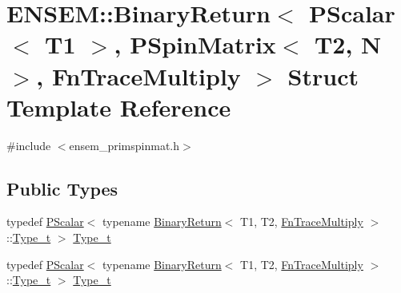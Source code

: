 \hypertarget{structENSEM_1_1BinaryReturn_3_01PScalar_3_01T1_01_4_00_01PSpinMatrix_3_01T2_00_01N_01_4_00_01FnTraceMultiply_01_4}{}\section{E\+N\+S\+EM\+:\+:Binary\+Return$<$ P\+Scalar$<$ T1 $>$, P\+Spin\+Matrix$<$ T2, N $>$, Fn\+Trace\+Multiply $>$ Struct Template Reference}
\label{structENSEM_1_1BinaryReturn_3_01PScalar_3_01T1_01_4_00_01PSpinMatrix_3_01T2_00_01N_01_4_00_01FnTraceMultiply_01_4}


{\ttfamily \#include $<$ensem\+\_\+primspinmat.\+h$>$}

\subsection*{Public Types}
\begin{DoxyCompactItemize}
\item 
typedef \mbox{\hyperlink{classENSEM_1_1PScalar}{P\+Scalar}}$<$ typename \mbox{\hyperlink{structENSEM_1_1BinaryReturn}{Binary\+Return}}$<$ T1, T2, \mbox{\hyperlink{structENSEM_1_1FnTraceMultiply}{Fn\+Trace\+Multiply}} $>$\+::\mbox{\hyperlink{structENSEM_1_1BinaryReturn_3_01PScalar_3_01T1_01_4_00_01PSpinMatrix_3_01T2_00_01N_01_4_00_01FnTraceMultiply_01_4_a54f389cea9ca5225ec2ae23f92c50307}{Type\+\_\+t}} $>$ \mbox{\hyperlink{structENSEM_1_1BinaryReturn_3_01PScalar_3_01T1_01_4_00_01PSpinMatrix_3_01T2_00_01N_01_4_00_01FnTraceMultiply_01_4_a54f389cea9ca5225ec2ae23f92c50307}{Type\+\_\+t}}
\item 
typedef \mbox{\hyperlink{classENSEM_1_1PScalar}{P\+Scalar}}$<$ typename \mbox{\hyperlink{structENSEM_1_1BinaryReturn}{Binary\+Return}}$<$ T1, T2, \mbox{\hyperlink{structENSEM_1_1FnTraceMultiply}{Fn\+Trace\+Multiply}} $>$\+::\mbox{\hyperlink{structENSEM_1_1BinaryReturn_3_01PScalar_3_01T1_01_4_00_01PSpinMatrix_3_01T2_00_01N_01_4_00_01FnTraceMultiply_01_4_a54f389cea9ca5225ec2ae23f92c50307}{Type\+\_\+t}} $>$ \mbox{\hyperlink{structENSEM_1_1BinaryReturn_3_01PScalar_3_01T1_01_4_00_01PSpinMatrix_3_01T2_00_01N_01_4_00_01FnTraceMultiply_01_4_a54f389cea9ca5225ec2ae23f92c50307}{Type\+\_\+t}}
\end{DoxyCompactItemize}


